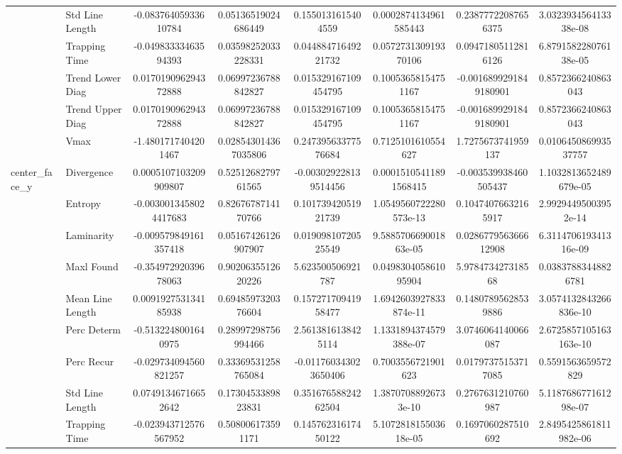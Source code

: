 \begin{tabular}{llcc|cc|cc}
 & Std Line Length & -0.08376405933610784 & 0.05136519024686449 & 0.1550131615404559 & 0.0002874134961585443 & 0.23877722087656375 & 3.032393456413338e-08 \\
 & Trapping Time & -0.04983333463594393 & 0.03598252033228331 & 0.04488471649221732 & 0.057273130919370106 & 0.09471805112816126 & 6.879158228076138e-05 \\
 & Trend Lower Diag & 0.017019096294372888 & 0.06997236788842827 & 0.015329167109454795 & 0.10053658154751167 & -0.0016899291849180901 & 0.8572366240863043 \\
 & Trend Upper Diag & 0.017019096294372888 & 0.06997236788842827 & 0.015329167109454795 & 0.10053658154751167 & -0.0016899291849180901 & 0.8572366240863043 \\
 & Vmax & -1.4801717404201467 & 0.028543014367035806 & 0.24739563377576684 & 0.7125101610554627 & 1.7275673741959137 & 0.010645086993537757 \\
\midrule
\multirow{12}{*}{center_face_y} & Divergence & 0.0005107103209909807 & 0.5251268279761565 & -0.003029228139514456 & 0.00015105411891568415 & -0.003539938460505437 & 1.1032813652489679e-05 \\
 & Entropy & -0.0030013458024417683 & 0.8267678714170766 & 0.10173942051921739 & 1.0549560722280573e-13 & 0.10474076632165917 & 2.99294495003952e-14 \\
 & Laminarity & -0.009579849161357418 & 0.05167426126907907 & 0.01909810720525549 & 9.588570669001863e-05 & 0.028677956366612908 & 6.311470619341316e-09 \\
 & Maxl Found & -0.35497292039678063 & 0.9020635512620226 & 5.623500506921787 & 0.049830405861095904 & 5.978473427318568 & 0.03837883448826781 \\
 & Mean Line Length & 0.009192753134185938 & 0.6948597320376604 & 0.15727170941958477 & 1.6942603927833874e-11 & 0.14807895628539886 & 3.0574132843266836e-10 \\
 & Perc Determ & -0.5132248001640975 & 0.28997298756994466 & 2.5613816138425114 & 1.1331894374579388e-07 & 3.0746064140066087 & 2.6725857105163163e-10 \\
 & Perc Recur & -0.029734094560821257 & 0.33369531258765084 & -0.011760343023650406 & 0.7003556721901623 & 0.01797375153717085 & 0.5591563659572829 \\
 & Std Line Length & 0.07491346716652642 & 0.1730453389823831 & 0.35167658824262504 & 1.38707088926733e-10 & 0.2767631210760987 & 5.118768677161298e-07 \\
 & Trapping Time & -0.023943712576567952 & 0.508006173591171 & 0.14576231617450122 & 5.107281815503618e-05 & 0.1697060287510692 & 2.8495425861811982e-06 \\

\end{tabular}

